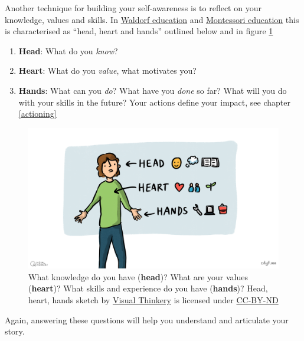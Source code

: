 \documentclass[
]{book}
\providecommand{\tightlist}{%
  \setlength{\itemsep}{0pt}\setlength{\parskip}{0pt}}
\begin{document}
Another technique for building your self-awareness is to reflect on your knowledge, values and skills. In \href{https://en.wikipedia.org/wiki/Waldorf_education}{Waldorf education} and \href{https://en.wikipedia.org/wiki/Montessori_education}{Montessori education} this is characterised as ``head, heart and hands'' outlined below and in figure \ref{fig:headhearthands-fig} \citep{headhearthands}

\begin{enumerate}
\def\labelenumi{\arabic{enumi}.}
\tightlist
\item
  \textbf{Head}: What do you \emph{know}?
\item
  \textbf{Heart}: What do you \emph{value}, what motivates you?
\item
  \textbf{Hands}: What can you \emph{do}? What have you \emph{done} so far? What will you do with your skills in the future? Your actions define your impact, see chapter \ref{actioning}
\end{enumerate}

\begin{figure}

{\centering \includegraphics[width=1\linewidth]{images/Head, heart and hands} 

}

\caption{What knowledge do you have (\textbf{head})? What are your values (\textbf{heart})? What skills and experience do you have (\textbf{hands})? Head, heart, hands sketch by \href{https://visualthinkery.com/}{Visual Thinkery} is licensed under \href{https://creativecommons.org/licenses/by-nd/4.0/}{CC-BY-ND}}\label{fig:headhearthands-fig}
\end{figure}



Again, answering these questions will help you understand and articulate your story.
\end{document}
